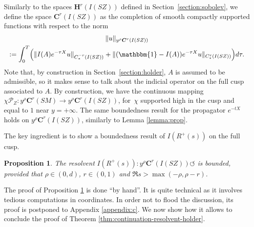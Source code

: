 \documentclass[10pt]{amsart}
\newcommand{\bC}{\boldsymbol{C}}
\newcommand{\bH}{\boldsymbol{H}}
\newcommand{\mc}{\mathcal}
\newcommand{\ZZ}{I(SZ)}
\theoremstyle{plain}
\newtheorem{proposition}{Proposition}[section]
\theoremstyle{definition}
\begin{document}
Similarly to the spaces $\bH^r(\ZZ)$ defined in Section~\ref{section:sobolev}, we define the space $\bC^r(\ZZ)$ as the completion of smooth compactly supported functions with respect to the norm
\begin{multline}
\label{equation:aniso-cusp}
\|u\|_{y^\rho \bC^r(\ZZ)}\\
:= \int_0^T \Bigl(\|I(A)e^{-\tau X} u\|_{C^{-r}_*(\ZZ)} + \|(\mathbbm{1}-I(A))e^{-\tau X} u\|_{C^r_*(\ZZ)}\Bigr) d\tau.
\end{multline}
Note that, by construction in Section~\ref{section:holder}, $A$ is assumed to be admissible, so it makes sense to talk about the indicial operator on the full cusp associated to $A$. By construction, we have the continuous mapping $\chi \mc{P}_Z : y^\rho \bC^r(SM) \to y^\rho \bC^r(\ZZ)$, for~$\chi$ supported high in the cusp and equal to $1$ near $y=+\infty$. The same boundedness result for the propagator $e^{-tX}$ holds on $y^\rho \bC^r(\ZZ)$, similarly to Lemma \ref{lemma:prop}.

The key ingredient is to show a boundedness result of $I(R^+(s))$ on the full cusp.

\begin{proposition}\label{prop:bound-indicial-resolvent-holder}
The resolvent $I(R^+(s)) : y^\rho \bC^r(\ZZ) \circlearrowleft$ is bounded, provided that $\rho \in (0,d)$, $r \in (0,1)$ and $\Re s > \max(-\rho,\rho-r)$.
\end{proposition}

The proof of Proposition \ref{prop:bound-indicial-resolvent-holder} is done ``by hand''. It is quite technical as it involves tedious computations in coordinates. In order not to flood the discussion, its proof is postponed to Appendix \ref{appendix:c}. We now show how it allows to conclude the proof of Theorem \ref{thm:continuation-resolvent-holder}.
\end{document}
